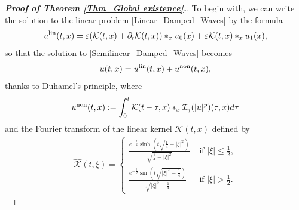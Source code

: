 \documentclass[11pt,reqno]{amsart}
\begin{document}
\begin{proof}[\textbf{Proof of Theorem \ref{Thm_Global existence}.}]

To begin with, we can write the solution to the linear problem \eqref{Linear_Damped_Waves} by the formula
$$
u^{\rm lin}(t,x) = \varepsilon (\mathcal{K}(t,x) +\partial_t \mathcal{K}(t,x))\ast_x u_0(x) + \varepsilon \mathcal{K}(t,x) \ast_x u_1(x),
$$
so that the solution to \eqref{Semilinear_Damped_Waves} becomes $$u(t,x)= u^{\rm lin}(t,x) + u^{\rm non}(t,x),$$ thanks to Duhamel's principle, where $$u^{\rm non}(t,x) := \int_0^t \mathcal{K}(t-\tau,x) \ast_x \mathcal{I}_\gamma(|u|^p)(\tau,x) d\tau$$ and the Fourier transform of the linear kernel $\mathcal{K}(t,x)$ defined by
\begin{align*}
\widehat{\mathcal{K}}(t,\xi)= \begin{cases}
\displaystyle\frac{e^{-\frac{t}{2}}\sinh{\left(t \sqrt{\frac{1}{4} -|\xi|^2}\right)}}{\sqrt{\frac{1}{4}- |\xi|^2}}  &\text{ if } |\xi| \leq \displaystyle\frac{1}{2},\\
\displaystyle\frac{e^{-\frac{t}{2}}\sin{\left(t \sqrt{|\xi|^2-\frac{1}{4}}\right)}}{\sqrt{|\xi|^2-\frac{1}{4}}} &\text{ if } |\xi| > \displaystyle\frac{1}{2}.
\end{cases}
\end{align*}


\end{proof}
\end{document}
